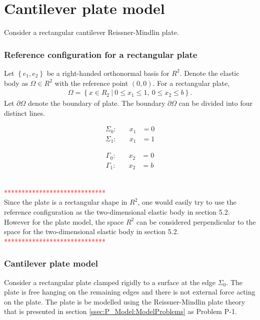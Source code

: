 \documentclass[../../main.tex]{subfiles}
\begin{document}
\section{Cantilever plate model}\label{sec:FEM:Plate}
Consider a rectangular cantilever Reissner-Mindlin plate.

\subsubsection{Reference configuration for a rectangular plate}
Let $\left\{e_1,e_2\right\}$ be a right-handed orthonormal basis for $R^2$. Denote the elastic body as $\Omega \in R^2$ with the reference point $(0,0)$. For a rectangular plate, 
\begin{eqnarray*}
	\Omega = \left \{ x \in R_2 \ | \ 0 \leq x_1 \leq 1, \ 0 \leq x_2 \leq b \right \}.
\end{eqnarray*} 
Let $\partial \Omega$ denote the boundary of plate. The boundary $\partial \Omega$ can be divided into four distinct lines.\\

\noindent\begin{minipage}{.5\linewidth}
	\begin{eqnarray*}
		\Sigma_0:& \quad x_1 &= 0\\
		\Sigma_1:& \quad x_1 &= 1
	\end{eqnarray*}
\end{minipage}%
\begin{minipage}{.5\linewidth}
	\begin{eqnarray*}
		\Gamma_0:& \quad x_2 &= 0\\
		\Gamma_1:& \quad x_2 &= b
	\end{eqnarray*}
\end{minipage}\\

\textcolor{red}{*****************************}\\
Since the plate is a rectangular shape in $R^2$, one would easily try to use the reference configuration as the two-dimensional elastic body in section 5.2. However for the plate model, the space $R^2$ can be considered perpendicular to the space for the two-dimensional elastic body in section 5.2.\\
\textcolor{red}{*****************************}

\subsubsection{Cantilever plate model}
Consider a rectangular plate clamped rigidly to a surface at the edge $\Sigma_0$. The plate is free hanging on the remaining edges and there is not external force acting on the plate. The plate is be modelled using the Reissner-Mindlin plate theory that is presented in section \ref{ssec:P_Model:ModelProblems} as Problem P-1.\\
\end{document}
